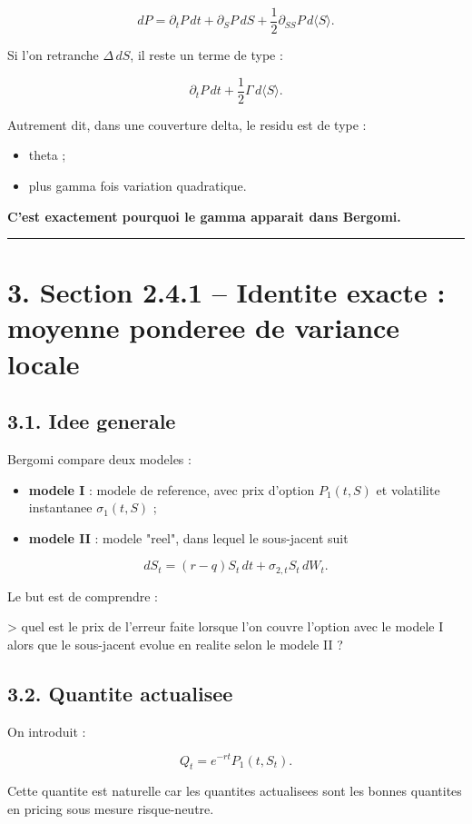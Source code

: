 \documentclass[11pt,a4paper]{article}
\begin{document}
\[
dP=\partial_t P\,dt+\partial_S P\,dS+\frac12 \partial_{SS}P\,d\langle S\rangle.
\]

Si l'on retranche \(\Delta\,dS\), il reste un terme de type :

\[
\partial_t P\,dt+\frac12 \Gamma\,d\langle S\rangle.
\]

Autrement dit, dans une couverture delta, le residu est de type :

\begin{itemize}
\item theta ;
\item plus gamma fois variation quadratique.
\end{itemize}

\textbf{C'est exactement pourquoi le gamma apparait dans Bergomi.}

\bigskip\hrule\bigskip

\section{3. Section 2.4.1 -- Identite exacte : moyenne ponderee de variance locale}

\subsection{3.1. Idee generale}

Bergomi compare deux modeles :

\begin{itemize}
\item \textbf{modele I} : modele de reference, avec prix d'option \(P_1(t,S)\) et volatilite instantanee \(\sigma_1(t,S)\) ;
\item \textbf{modele II} : modele "reel", dans lequel le sous-jacent suit
\end{itemize}
\[
  dS_t=(r-q)S_t\,dt+\sigma_{2,t}S_t\,dW_t.
\]

Le but est de comprendre :

> quel est le prix de l'erreur faite lorsque l'on couvre l'option avec le modele I alors que le sous-jacent evolue en realite selon le modele II ?

\subsection{3.2. Quantite actualisee}

On introduit :

\[
Q_t=e^{-rt}P_1(t,S_t).
\]

Cette quantite est naturelle car les quantites actualisees sont les bonnes quantites en pricing sous mesure risque-neutre.
\end{document}
